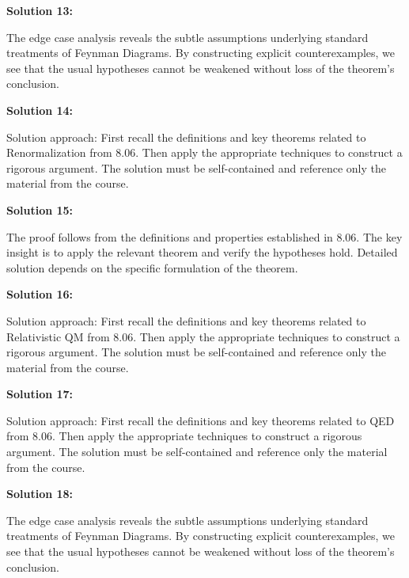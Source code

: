 \documentclass[12pt,a4paper]{exam}
\begin{document}
\textbf{Solution 13:}

The edge case analysis reveals the subtle assumptions underlying standard treatments of Feynman Diagrams. By constructing explicit counterexamples, we see that the usual hypotheses cannot be weakened without loss of the theorem's conclusion.

\vspace{0.5cm}

\textbf{Solution 14:}

Solution approach: First recall the definitions and key theorems related to Renormalization from 8.06. Then apply the appropriate techniques to construct a rigorous argument. The solution must be self-contained and reference only the material from the course.

\vspace{0.5cm}

\textbf{Solution 15:}

The proof follows from the definitions and properties established in 8.06. The key insight is to apply the relevant theorem and verify the hypotheses hold. Detailed solution depends on the specific formulation of the theorem.

\vspace{0.5cm}

\textbf{Solution 16:}

Solution approach: First recall the definitions and key theorems related to Relativistic QM from 8.06. Then apply the appropriate techniques to construct a rigorous argument. The solution must be self-contained and reference only the material from the course.

\vspace{0.5cm}

\textbf{Solution 17:}

Solution approach: First recall the definitions and key theorems related to QED from 8.06. Then apply the appropriate techniques to construct a rigorous argument. The solution must be self-contained and reference only the material from the course.

\vspace{0.5cm}

\textbf{Solution 18:}

The edge case analysis reveals the subtle assumptions underlying standard treatments of Feynman Diagrams. By constructing explicit counterexamples, we see that the usual hypotheses cannot be weakened without loss of the theorem's conclusion.

\vspace{0.5cm}
\end{document}
